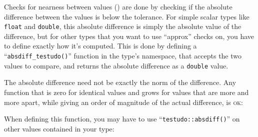 \documentclass[twoside, a4paper, article]{memoir}
\providecommand\typesetexample[1]{%
}
\begin{document}
Checks for nearness between values ()
are done by checking if the absolute difference between the values is below the
tolerance.  For simple scalar types like \texttt{float} and \texttt{double},
this absolute difference is simply the absolute value of the difference, but
for other types that you want to use ``approx'' checks on, you have to define
exactly how it's computed.  This is done by defining a
``\texttt{absdiff\_testudo()}'' function in the type's namespace, that accepts
the two values to compare, and returns the absolute difference as a
\texttt{double} value.

\typesetexample{testudo-support-my-vector-absdiff-testudo}

The absolute difference need not be exactly the norm of the difference.  Any
function that is zero for identical values and grows for values that are more
and more apart, while giving an order of magnitude of the actual difference, is
\textsc{ok}:

\typesetexample{testudo-support-my-vector-absdiff-testudo-manhattan}

When defining this function, you may have to use
``\texttt{testudo::absdiff()}'' on other values contained in your type:

\typesetexample{testudo-support-my-vector-absdiff-testudo-absdiff}





\end{document}
